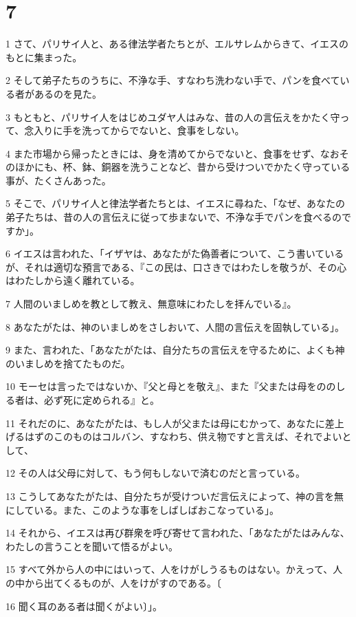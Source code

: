 \chapter{7}

\par 1 さて、パリサイ人と、ある律法学者たちとが、エルサレムからきて、イエスのもとに集まった。
\par 2 そして弟子たちのうちに、不浄な手、すなわち洗わない手で、パンを食べている者があるのを見た。
\par 3 もともと、パリサイ人をはじめユダヤ人はみな、昔の人の言伝えをかたく守って、念入りに手を洗ってからでないと、食事をしない。
\par 4 また市場から帰ったときには、身を清めてからでないと、食事をせず、なおそのほかにも、杯、鉢、銅器を洗うことなど、昔から受けついでかたく守っている事が、たくさんあった。
\par 5 そこで、パリサイ人と律法学者たちとは、イエスに尋ねた、「なぜ、あなたの弟子たちは、昔の人の言伝えに従って歩まないで、不浄な手でパンを食べるのですか」。
\par 6 イエスは言われた、「イザヤは、あなたがた偽善者について、こう書いているが、それは適切な預言である、『この民は、口さきではわたしを敬うが、その心はわたしから遠く離れている。
\par 7 人間のいましめを教として教え、無意味にわたしを拝んでいる』。
\par 8 あなたがたは、神のいましめをさしおいて、人間の言伝えを固執している」。
\par 9 また、言われた、「あなたがたは、自分たちの言伝えを守るために、よくも神のいましめを捨てたものだ。
\par 10 モーセは言ったではないか、『父と母とを敬え』、また『父または母をののしる者は、必ず死に定められる』と。
\par 11 それだのに、あなたがたは、もし人が父または母にむかって、あなたに差上げるはずのこのものはコルバン、すなわち、供え物ですと言えば、それでよいとして、
\par 12 その人は父母に対して、もう何もしないで済むのだと言っている。
\par 13 こうしてあなたがたは、自分たちが受けついだ言伝えによって、神の言を無にしている。また、このような事をしばしばおこなっている」。
\par 14 それから、イエスは再び群衆を呼び寄せて言われた、「あなたがたはみんな、わたしの言うことを聞いて悟るがよい。
\par 15 すべて外から人の中にはいって、人をけがしうるものはない。かえって、人の中から出てくるものが、人をけがすのである。〔
\par 16 聞く耳のある者は聞くがよい〕」。
